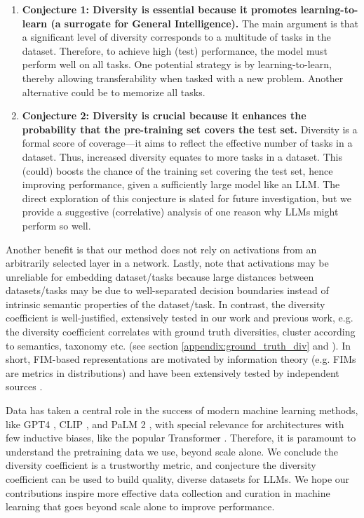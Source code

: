 \documentclass[10pt]{article} %
\begin{document}
\begin{enumerate}
    \item \textbf{Conjecture 1: Diversity is essential because it promotes learning-to-learn (a surrogate for General Intelligence).} 
    The main argument is that a significant level of diversity corresponds to a multitude of tasks in the dataset.
    Therefore, to achieve high (test) performance, the model must perform well on all tasks.
    One potential strategy is by learning-to-learn, thereby allowing transferability when tasked with a new problem. 
    Another alternative could be to memorize all tasks. 
    \item \textbf{Conjecture 2: Diversity is crucial because it enhances the probability that the pre-training set covers the test set.}
    Diversity is a formal score of coverage---it aims to reflect the effective number of tasks in a dataset.
    Thus, increased diversity equates to more tasks in a dataset.
    This (could) boosts the chance of the training set covering the test set, hence improving performance, given a sufficiently large model like an LLM.
    The direct exploration of this conjecture is slated for future investigation, but we provide a suggestive (correlative) analysis of one reason why LLMs might perform so well. 
\end{enumerate}

Another benefit is that our method does not rely on activations from an arbitrarily selected layer in a network.
Lastly, note that activations may be unreliable for embedding dataset/tasks because large distances between datasets/tasks may be due to well-separated decision boundaries instead of intrinsic semantic properties of the dataset/task.
In contrast, the diversity coefficient is well-justified, extensively tested in our work and previous work, e.g. the diversity coefficient correlates with ground truth diversities, cluster according to semantics, taxonomy etc. (see section \ref{appendix:ground_truth_div} and \cite{task2vec, curse_low_div}). 
In short, FIM-based representations are motivated by information theory (e.g. FIMs are metrics in distributions) and have been extensively tested by independent sources \citep{curse_low_div, task2vec, nlp_task2vec}.

Data has taken a central role in the success of modern machine learning methods, like GPT4 \cite{gpt4}, CLIP \cite{clip}, and PaLM 2 \cite{google2023palm2}, with special relevance for architectures with few inductive biases, like the popular Transformer \citep{vaswani2017attention}.
Therefore, it is paramount to understand the pretraining data we use, beyond scale alone.
We conclude the diversity coefficient is a trustworthy metric, and conjecture the diversity coefficient can be used to build quality, diverse datasets for LLMs.
We hope our contributions inspire more effective data collection and curation in machine learning that goes beyond scale alone to improve performance. 
\end{document}
